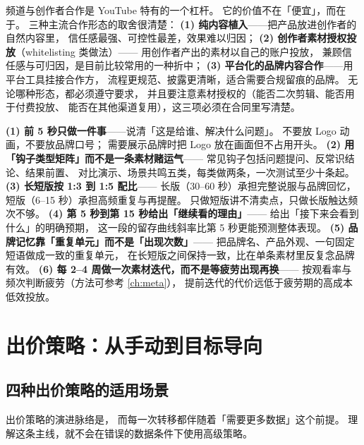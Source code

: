 频道与创作者合作是 YouTube 特有的一个杠杆。
它的价值不在「便宜」，而在于。
三种主流合作形态的取舍很清楚：
\textbf{(1) 纯内容植入}——把产品放进创作者的自然内容里，
信任感最强、可控性最差，效果难以归因；
\textbf{(2) 创作者素材授权投放}（whitelisting 类做法）——
用创作者产出的素材以自己的账户投放，
兼顾信任感与可归因，是目前比较常用的一种折中；
\textbf{(3) 平台化的品牌内容合作}——用平台工具挂接合作方，
流程更规范、披露更清晰，适合需要合规留痕的品牌。
无论哪种形态，都必须遵守要求，
并且要注意素材授权的（能否二次剪辑、能否用于付费投放、
能否在其他渠道复用），这三项必须在合同里写清楚。

\begin{toolbox}
\textbf{(1) 前 5 秒只做一件事}——说清「这是给谁、解决什么问题」。
不要放 Logo 动画，不要放品牌口号；
需要展示品牌时把 Logo 放在画面但不占用开头。
\textbf{(2) 用「钩子类型矩阵」而不是一条素材赌运气}——
常见钩子包括问题提问、反常识结论、结果前置、
对比演示、场景共鸣五类，每类做两条，一次测试至少十条起。
\textbf{(3) 长短版按 1:3 到 1:5 配比}——
长版（30--60 秒）承担完整说服与品牌回忆，
短版（6--15 秒）承担高频重复与再提醒。
只做短版讲不清卖点，只做长版触达频次不够。
\textbf{(4) 第 5 秒到第 15 秒给出「继续看的理由」}——
给出「接下来会看到什么」的明确预期，
这一段的留存曲线斜率比第 5 秒更能预测整体表现。
\textbf{(5) 品牌记忆靠「重复单元」而不是「出现次数」}——
把品牌名、产品外观、一句固定短语做成一致的重复单元，
在长短版之间保持一致，比在单条素材里反复念品牌有效。
\textbf{(6) 每 2--4 周做一次素材迭代，而不是等疲劳出现再换}——
按观看率与频次判断疲劳（方法可参考 \cref{ch:meta}），
提前迭代的代价远低于疲劳期的高成本低效投放。
\end{toolbox}

\section{出价策略：从手动到目标导向}
\label{sec:g-bid}

\subsection{四种出价策略的适用场景}

出价策略的演进脉络是，
而每一次转移都伴随着「需要更多数据」这个前提。
理解这条主线，就不会在错误的数据条件下使用高级策略。

